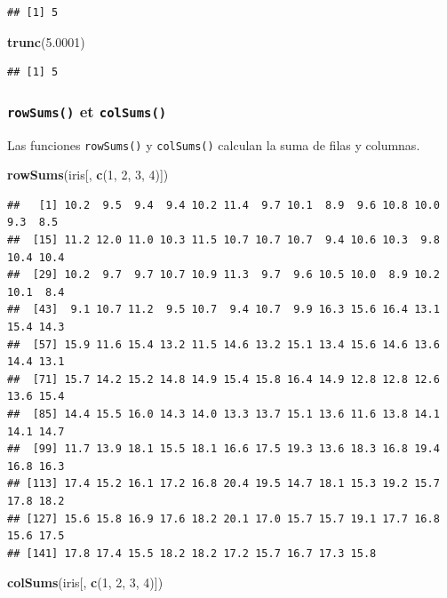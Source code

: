 \documentclass[]{book}
\newenvironment{Shaded}{\begin{snugshade}}{\end{snugshade}}
\newcommand{\KeywordTok}[1]{\textcolor[rgb]{0.13,0.29,0.53}{\textbf{#1}}}
\newcommand{\DecValTok}[1]{\textcolor[rgb]{0.00,0.00,0.81}{#1}}
\newcommand{\FloatTok}[1]{\textcolor[rgb]{0.00,0.00,0.81}{#1}}
\newcommand{\NormalTok}[1]{#1}
\begin{document}
\begin{verbatim}
## [1] 5
\end{verbatim}

\begin{Shaded}
\begin{Highlighting}[]
\KeywordTok{trunc}\NormalTok{(}\FloatTok{5.0001}\NormalTok{)}
\end{Highlighting}
\end{Shaded}

\begin{verbatim}
## [1] 5
\end{verbatim}

\subsubsection{\texorpdfstring{\texttt{rowSums()} et
\texttt{colSums()}}{rowSums() et colSums()}}\label{l015rowsums}

Las funciones \texttt{rowSums()} y \texttt{colSums()} calculan la suma
de filas y columnas.

\begin{Shaded}
\begin{Highlighting}[]
\KeywordTok{rowSums}\NormalTok{(iris[, }\KeywordTok{c}\NormalTok{(}\DecValTok{1}\NormalTok{, }\DecValTok{2}\NormalTok{, }\DecValTok{3}\NormalTok{, }\DecValTok{4}\NormalTok{)])}
\end{Highlighting}
\end{Shaded}

\begin{verbatim}
##   [1] 10.2  9.5  9.4  9.4 10.2 11.4  9.7 10.1  8.9  9.6 10.8 10.0  9.3  8.5
##  [15] 11.2 12.0 11.0 10.3 11.5 10.7 10.7 10.7  9.4 10.6 10.3  9.8 10.4 10.4
##  [29] 10.2  9.7  9.7 10.7 10.9 11.3  9.7  9.6 10.5 10.0  8.9 10.2 10.1  8.4
##  [43]  9.1 10.7 11.2  9.5 10.7  9.4 10.7  9.9 16.3 15.6 16.4 13.1 15.4 14.3
##  [57] 15.9 11.6 15.4 13.2 11.5 14.6 13.2 15.1 13.4 15.6 14.6 13.6 14.4 13.1
##  [71] 15.7 14.2 15.2 14.8 14.9 15.4 15.8 16.4 14.9 12.8 12.8 12.6 13.6 15.4
##  [85] 14.4 15.5 16.0 14.3 14.0 13.3 13.7 15.1 13.6 11.6 13.8 14.1 14.1 14.7
##  [99] 11.7 13.9 18.1 15.5 18.1 16.6 17.5 19.3 13.6 18.3 16.8 19.4 16.8 16.3
## [113] 17.4 15.2 16.1 17.2 16.8 20.4 19.5 14.7 18.1 15.3 19.2 15.7 17.8 18.2
## [127] 15.6 15.8 16.9 17.6 18.2 20.1 17.0 15.7 15.7 19.1 17.7 16.8 15.6 17.5
## [141] 17.8 17.4 15.5 18.2 18.2 17.2 15.7 16.7 17.3 15.8
\end{verbatim}

\begin{Shaded}
\begin{Highlighting}[]
\KeywordTok{colSums}\NormalTok{(iris[, }\KeywordTok{c}\NormalTok{(}\DecValTok{1}\NormalTok{, }\DecValTok{2}\NormalTok{, }\DecValTok{3}\NormalTok{, }\DecValTok{4}\NormalTok{)])}
\end{Highlighting}
\end{Shaded}
\end{document}
